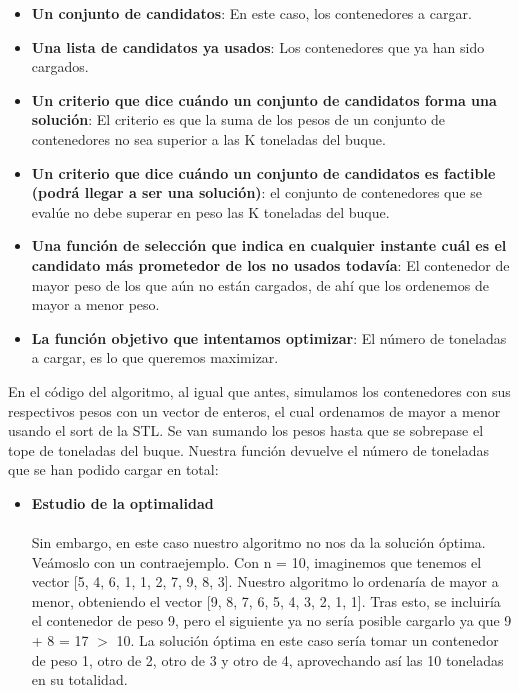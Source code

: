 \documentclass[10pt,a4paper]{article}
\begin{document}
	\begin{itemize}
		\item \textbf{Un conjunto de candidatos}: En este caso, los contenedores a cargar.
		\item \textbf{Una lista de candidatos ya usados}: Los contenedores que ya han sido cargados.
		\item \textbf{Un criterio que dice cuándo un conjunto de candidatos forma una solución}: El criterio es que la suma de los pesos de un conjunto de contenedores no sea superior a las K toneladas del buque.
		\item \textbf{Un criterio que dice cuándo un conjunto de candidatos es factible (podrá llegar a ser una solución)}: el conjunto de contenedores que se evalúe no debe superar en peso las K toneladas del buque.
		\item \textbf{Una función de selección que indica en cualquier instante cuál es el candidato más prometedor de los no usados todavía}: El contenedor de mayor peso de los que aún no están cargados, de ahí que los ordenemos de mayor a menor peso.
		\item \textbf{La función objetivo que intentamos optimizar}: El número de toneladas a cargar, es lo que queremos maximizar.
	\end{itemize}

	En el código del algoritmo, al igual que antes, simulamos los contenedores con sus respectivos pesos con un vector de enteros, el cual ordenamos de mayor a menor usando el sort de la STL. Se van sumando los pesos hasta que se sobrepase el tope de toneladas del buque. Nuestra función devuelve el número de toneladas que se han podido cargar en total:
	
	
	
	\begin{itemize}
		\item \textbf{Estudio de la optimalidad}
		\\
		\\
		Sin embargo, en este caso nuestro algoritmo no nos da la solución óptima. Veámoslo con un contraejemplo. Con n = 10, imaginemos que tenemos el vector [5, 4, 6, 1, 1, 2, 7, 9, 8, 3].
		Nuestro algoritmo lo ordenaría de mayor a menor, obteniendo el vector [9, 8, 7, 6, 5, 4, 3, 2, 1, 1]. Tras esto, se incluiría el contenedor de peso 9, pero el siguiente ya no sería posible cargarlo ya que 9 + 8 = 17 $>$ 10. La solución óptima en este caso sería tomar un contenedor de peso 1, otro de 2, otro de 3 y otro de 4, aprovechando así las 10 toneladas en su totalidad.
	\end{itemize}
	
\end{document}

